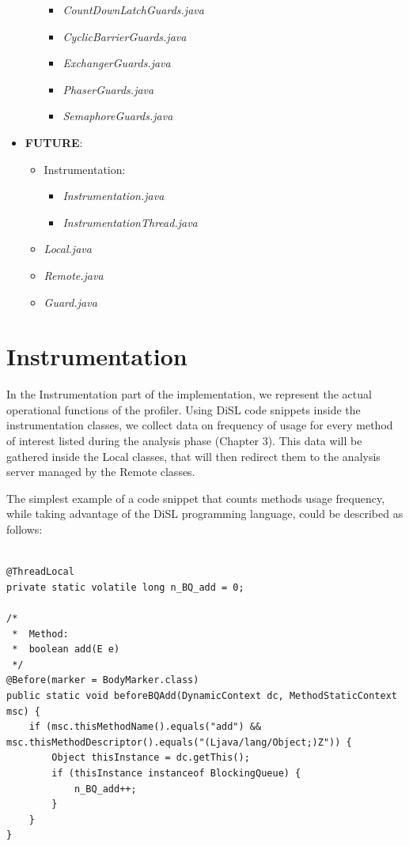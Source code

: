 \documentclass[]{usiinfthesis}
\begin{document}
\begin{itemize}
\begin{itemize}
        \begin{itemize}
            \item \textit{CountDownLatchGuards.java}
            \item \textit{CyclicBarrierGuards.java}
            \item \textit{ExchangerGuards.java}
            \item \textit{PhaserGuards.java}
            \item \textit{SemaphoreGuards.java}
        \end{itemize}
    \end{itemize}
    \item \textbf{FUTURE}:
    \begin{itemize}
        \item Instrumentation:
        \begin{itemize}
            \item \textit{Instrumentation.java}
            \item \textit{InstrumentationThread.java}
        \end{itemize}
        \item \textit{Local.java}
        \item \textit{Remote.java}
        \item \textit{Guard.java}
    \end{itemize}
\end{itemize}

\large
\section{Instrumentation}
In the Instrumentation part of the implementation, we represent the actual operational functions of the profiler. Using DiSL code snippets inside the instrumentation classes, we collect data on frequency of usage for every method of interest listed during the analysis phase (Chapter 3). This data will be gathered inside the Local classes, that will then redirect them to the analysis server managed by the Remote classes.

\noindent The simplest example of a code snippet that counts methods usage frequency, while taking advantage of the DiSL programming language, could be described as follows:

\vspace*{0.5cm}
\begin{verbatim}

@ThreadLocal
private static volatile long n_BQ_add = 0;

/*
 *  Method:
 *  boolean add(E e)
 */
@Before(marker = BodyMarker.class)
public static void beforeBQAdd(DynamicContext dc, MethodStaticContext msc) {
    if (msc.thisMethodName().equals("add") && msc.thisMethodDescriptor().equals("(Ljava/lang/Object;)Z")) {
        Object thisInstance = dc.getThis();
        if (thisInstance instanceof BlockingQueue) {
            n_BQ_add++;
        }
    }
}
\end{verbatim}
\vspace*{0.5cm}
\end{document}
